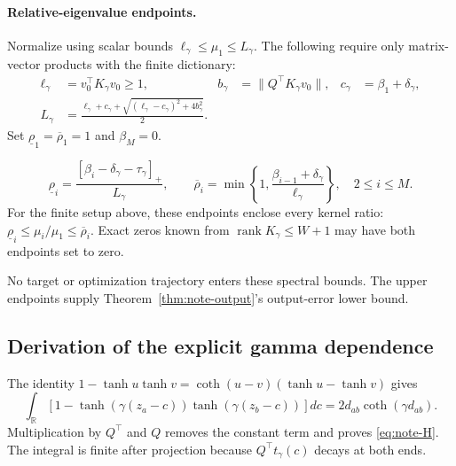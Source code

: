 \paragraph{Relative-eigenvalue endpoints.}
Normalize using scalar bounds $\ell_\gamma\le\mu_1\le L_\gamma$.
The following require only matrix-vector products with the finite dictionary:
\begin{align}
 \ell_\gamma&=v_0^\top K_\gamma v_0\ge1,
 &b_\gamma&=\|Q^\top K_\gamma v_0\|,
 &c_\gamma&=\beta_1+\delta_\gamma,\\
 L_\gamma&=\frac{\ell_\gamma+c_\gamma+
 \sqrt{(\ell_\gamma-c_\gamma)^2+4b_\gamma^2}}2.
 \label{eq:note-normalization}
\end{align}
Set $\underline\rho_1=\overline\rho_1=1$ and $\beta_M=0$.
\begin{theorem}
\label{thm:note-rates}
\begin{equation}
 \boxed{\underline\rho_i=
 \frac{[\beta_i-\delta_\gamma-\tau_\gamma]_+}{L_\gamma},
 \qquad
 \overline\rho_i=\min\!\left\{1,
 \frac{\beta_{i-1}+\delta_\gamma}{\ell_\gamma}\right\},
 \quad 2\le i\le M.}
 \label{eq:note-endpoints}
\end{equation}
For the finite setup above, these endpoints enclose every kernel ratio:
$\underline\rho_i\le\mu_i/\mu_1\le\overline\rho_i$.
Exact zeros known from $\operatorname{rank}K_\gamma\le W+1$ may have both
endpoints set to zero.
\end{theorem}
No target or optimization trajectory enters these spectral bounds.
The upper endpoints supply Theorem~\ref{thm:note-output}'s output-error lower bound.

\subsection{Derivation of the explicit gamma dependence}
The identity
$1-\tanh u\tanh v=\coth(u-v)(\tanh u-\tanh v)$ gives
\begin{equation}
 \int_{\mathbb R}[1-\tanh(\gamma(z_a-c))\tanh(\gamma(z_b-c))]dc
 =2d_{ab}\coth(\gamma d_{ab}).
\end{equation}
Multiplication by $Q^\top$ and $Q$ removes the constant term and proves
\eqref{eq:note-H}. The integral is finite after projection because
$Q^\top t_\gamma(c)$ decays at both ends.

